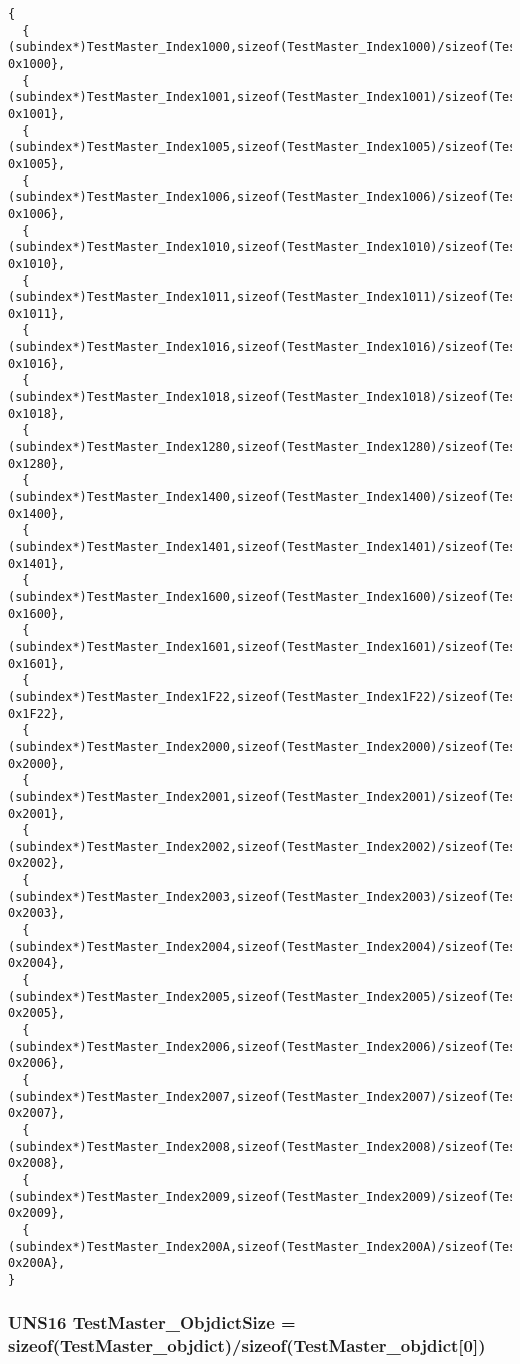 \begin{Code}\begin{verbatim} 
{
  { (subindex*)TestMaster_Index1000,sizeof(TestMaster_Index1000)/sizeof(TestMaster_Index1000[0]), 0x1000},
  { (subindex*)TestMaster_Index1001,sizeof(TestMaster_Index1001)/sizeof(TestMaster_Index1001[0]), 0x1001},
  { (subindex*)TestMaster_Index1005,sizeof(TestMaster_Index1005)/sizeof(TestMaster_Index1005[0]), 0x1005},
  { (subindex*)TestMaster_Index1006,sizeof(TestMaster_Index1006)/sizeof(TestMaster_Index1006[0]), 0x1006},
  { (subindex*)TestMaster_Index1010,sizeof(TestMaster_Index1010)/sizeof(TestMaster_Index1010[0]), 0x1010},
  { (subindex*)TestMaster_Index1011,sizeof(TestMaster_Index1011)/sizeof(TestMaster_Index1011[0]), 0x1011},
  { (subindex*)TestMaster_Index1016,sizeof(TestMaster_Index1016)/sizeof(TestMaster_Index1016[0]), 0x1016},
  { (subindex*)TestMaster_Index1018,sizeof(TestMaster_Index1018)/sizeof(TestMaster_Index1018[0]), 0x1018},
  { (subindex*)TestMaster_Index1280,sizeof(TestMaster_Index1280)/sizeof(TestMaster_Index1280[0]), 0x1280},
  { (subindex*)TestMaster_Index1400,sizeof(TestMaster_Index1400)/sizeof(TestMaster_Index1400[0]), 0x1400},
  { (subindex*)TestMaster_Index1401,sizeof(TestMaster_Index1401)/sizeof(TestMaster_Index1401[0]), 0x1401},
  { (subindex*)TestMaster_Index1600,sizeof(TestMaster_Index1600)/sizeof(TestMaster_Index1600[0]), 0x1600},
  { (subindex*)TestMaster_Index1601,sizeof(TestMaster_Index1601)/sizeof(TestMaster_Index1601[0]), 0x1601},
  { (subindex*)TestMaster_Index1F22,sizeof(TestMaster_Index1F22)/sizeof(TestMaster_Index1F22[0]), 0x1F22},
  { (subindex*)TestMaster_Index2000,sizeof(TestMaster_Index2000)/sizeof(TestMaster_Index2000[0]), 0x2000},
  { (subindex*)TestMaster_Index2001,sizeof(TestMaster_Index2001)/sizeof(TestMaster_Index2001[0]), 0x2001},
  { (subindex*)TestMaster_Index2002,sizeof(TestMaster_Index2002)/sizeof(TestMaster_Index2002[0]), 0x2002},
  { (subindex*)TestMaster_Index2003,sizeof(TestMaster_Index2003)/sizeof(TestMaster_Index2003[0]), 0x2003},
  { (subindex*)TestMaster_Index2004,sizeof(TestMaster_Index2004)/sizeof(TestMaster_Index2004[0]), 0x2004},
  { (subindex*)TestMaster_Index2005,sizeof(TestMaster_Index2005)/sizeof(TestMaster_Index2005[0]), 0x2005},
  { (subindex*)TestMaster_Index2006,sizeof(TestMaster_Index2006)/sizeof(TestMaster_Index2006[0]), 0x2006},
  { (subindex*)TestMaster_Index2007,sizeof(TestMaster_Index2007)/sizeof(TestMaster_Index2007[0]), 0x2007},
  { (subindex*)TestMaster_Index2008,sizeof(TestMaster_Index2008)/sizeof(TestMaster_Index2008[0]), 0x2008},
  { (subindex*)TestMaster_Index2009,sizeof(TestMaster_Index2009)/sizeof(TestMaster_Index2009[0]), 0x2009},
  { (subindex*)TestMaster_Index200A,sizeof(TestMaster_Index200A)/sizeof(TestMaster_Index200A[0]), 0x200A},
}
\end{verbatim}\end{Code}
\subsubsection{\setlength{\rightskip}{0pt plus 5cm}UNS16 {\bf Test\-Master\_\-Objdict\-Size} = sizeof({\bf Test\-Master\_\-objdict})/sizeof({\bf Test\-Master\_\-objdict}[0])}\label{TestMasterSlave_2TestMaster_8c_827827be557e9e59d6ba299f812aad66}


